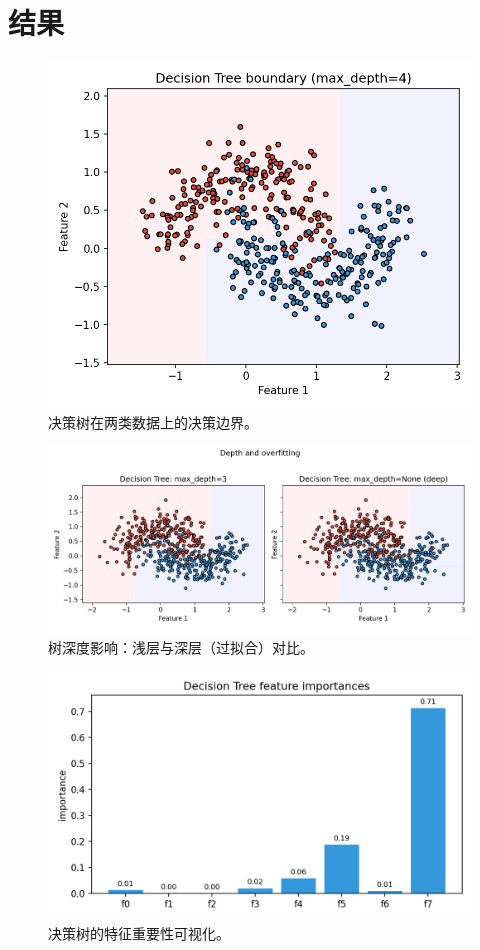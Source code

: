 \documentclass[UTF8,zihao=-4]{ctexart}
\begin{document}
\section{结果}
\begin{figure}[H]
  \centering
  \includegraphics[width=0.9\linewidth]{dt_decision_boundary_2class.png}
  \caption{决策树在两类数据上的决策边界。}
  \label{fig:dt2_cn}
\end{figure}
\FloatBarrier

\begin{figure}[H]
  \centering
  \includegraphics[width=0.95\linewidth]{dt_depth_compare.png}
  \caption{树深度影响：浅层与深层（过拟合）对比。}
  \label{fig:depth_cn}
\end{figure}
\FloatBarrier

\begin{figure}[H]
  \centering
  \includegraphics[width=0.85\linewidth]{dt_feature_importances.png}
  \caption{决策树的特征重要性可视化。}
  \label{fig:fi_cn}
\end{figure}
\FloatBarrier
\end{document}
